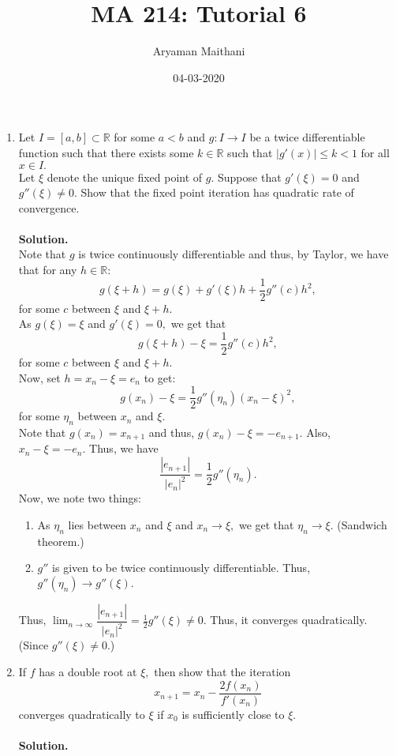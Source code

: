 \documentclass{article}
\title{MA 214: Tutorial 6}
\author{Aryaman Maithani}
\date{04-03-2020}
\begin{document}
\maketitle
\begin{enumerate} 
	\item Let $I = [a, b] \subset \mathbb{R}$ for some $a < b$ and $g:I\to I$ be a twice differentiable function such that there exists some $k \in \mathbb{R}$ such that $|g'(x)| \le k < 1$ for all $x \in I.$\\
	Let $\xi$ denote the unique fixed point of $g.$ Suppose that $g'(\xi) = 0$ and $g''(\xi) \neq 0.$ Show that the fixed point iteration has quadratic rate of convergence.\\~\\
	\textbf{Solution.}\\
	Note that $g$ is twice continuously differentiable and thus, by Taylor, we have that for any $h \in \mathbb{R}$:
	\[g(\xi + h) = g(\xi) + g'(\xi)h + \frac{1}{2}g''(c)h^2,\]
	for some $c$ between $\xi$ and $\xi + h.$\\
	As $g(\xi) = \xi$ and $g'(\xi) = 0,$ we get that
	\[g(\xi + h) - \xi = \frac{1}{2}g''(c)h^2,\]
	for some $c$ between $\xi$ and $\xi + h.$\\
	Now, set $h = x_{n} - \xi = e_{n}$ to get:
	\[g(x_{n}) - \xi = \frac{1}{2}g''(\eta_n)(x_n - \xi)^2,\]
	for some $\eta_n$ between $x_n$ and $\xi.$\\
	Note that $g(x_n) = x_{n+1}$ and thus, $g(x_n) - \xi = -e_{n+1}.$ Also, $x_n - \xi = -e_n.$ Thus, we have
	\[\frac{|e_{n+1}|}{|e_n|^2} = \frac{1}{2}g''(\eta_n).\]
	Now, we note two things:
	\begin{enumerate}[nosep] 
	 	\item As $\eta_n$ lies between $x_n$ and $\xi$ and $x_n \to \xi,$ we get that $\eta_n \to \xi.$ (Sandwich theorem.)
	 	\item $g''$ is given to be twice continuously differentiable. Thus, $g''(\eta_n) \to g''(\xi).$
	\end{enumerate} 
	Thus, $\displaystyle\lim_{n\to \infty}\dfrac{|e_{n+1}|}{|e_n|^2} = \frac{1}{2}g''(\xi) \neq 0.$ Thus, it converges quadratically. (Since $g''(\xi) \neq 0.$)
	\item If $f$ has a double root at $\xi,$ then show that the iteration
	\[x_{n+1} = x_n - \frac{2f(x_n)}{f'(x_n)}\]
	converges quadratically to $\xi$ if $x_0$ is sufficiently close to $\xi.$\\~\\
	\textbf{Solution.} \\

\end{enumerate}
\end{document}
